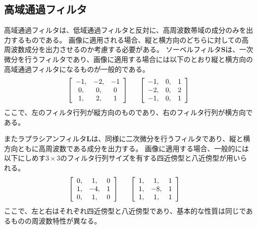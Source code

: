 \documentclass[11pt,a4paper]{jsarticle}
\begin{document}
\subsection{高域通過フィルタ}\label{sec:Highpassfilter}
高域通過フィルタは、低域通過フィルタと反対に、高周波数帯域の成分のみを出力するものである。
画像に適用される場合、縦と横方向のどちらに対しての高周波数成分を出力させるのか考慮する必要がある。
ソーベルフィルタ$\mathbf{S}$は、一次微分を行うフィルタであり、画像に適用する場合には以下のとおり縦と横方向の高域通過フィルタになるものが一般的である。
\begin{equation*}
	\left[\begin{array}{ccc}
		-1,&-2,&-1\\
		0,&0,&0\\
		1,&2,&1
	\end{array}\right]
	\hspace{+16pt}
	\left[\begin{array}{ccc}
		-1,&0,&1\\
		-2,&0,&2\\
		-1,&0,&1
	\end{array}\right]	
\end{equation*}
ここで、左のフィルタ行列が縦方向のものであり、右のフィルタ行列が横方向である。

またラプラシアンフィルタ$\mathbf{L}$は、同様に二次微分を行うフィルタであり、縦と横方向ともに高周波数である成分を出力する。
画像に適用する場合、一般的には以下にしめす$3\times 3$のフィルタ行列サイズを有する四近傍型と八近傍型が用いられる。
\begin{equation*}
	\hspace{-12pt}
	\left[\begin{array}{ccc}
		0,&1,&0\\
		1,&-4,&1\\
		0,&1,&0
	\end{array}\right]
	\hspace{+16pt}
	\left[\begin{array}{ccc}
		1,&1,&1\\
		1,&-8,&1\\
		1,&1,&1
	\end{array}\right]
\end{equation*}
ここで、左と右はそれぞれ四近傍型と八近傍型であり、基本的な性質は同じであるものの周波数特性が異なる。


\end{document}

